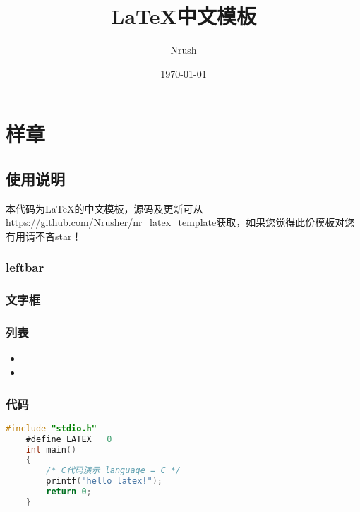 \documentclass{book}
\begin{document}
\title{\LaTeX 中文模板}
\author{{Nrush}}
\date{\today}
\maketitle
\thispagestyle{empty}
\newpage

\tableofcontents
\setcounter{page}{1}
\newpage


\chapter{样章}
\setcounter{page}{1}
\section{使用说明}
本代码为\LaTeX 的中文模板，源码及更新可从\url{https://github.com/Nrusher/nr_latex_template}获取，如果您觉得此份模板对您有用请不吝star！

\subsection{leftbar}
\begin{leftbar}
    \zhlipsum[1][name = zhufu]
\end{leftbar}

\subsection{文字框}
\begin{framed}
    \zhlipsum[1][name = xiangyu]
\end{framed}

\subsection{列表}
\begin{itemize}
    \item \zhlipsum[1][name =jingyesi]
    \item \zhlipsum[1][name =jingyesi]
\end{itemize}

\subsection{代码}
\begin{lstlisting}[language = C]
    #include "stdio.h"
    #define LATEX   0
    int main()
    {
        /* C代码演示 language = C */
        printf("hello latex!");
        return 0;
    }
\end{lstlisting}
\end{document}
